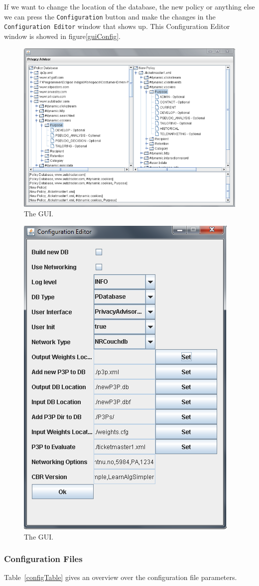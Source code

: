 
If we want to change the location of the database, the new policy or anything else we can press the \texttt{Configuration} button and make the changes in the \texttt{Configuration Editor} window that shows up. This Configuration Editor window is showed in figure\ref{guiConfig}.

 \begin{figure}
     \includegraphics[width = .48\textwidth]{Documentation/gui.png}
     \caption{The GUI.}
   \label{guiFigure}
 \end{figure}

   \begin{figure}
     \includegraphics[width = .48\textwidth]{Documentation/gui_config.png}
     \caption{The GUI.}
   \label{guiFigure}
 \end{figure}


\subsubsection{Configuration Files}

Table~\ref{configTable} gives an overview over the configuration file parameters.

